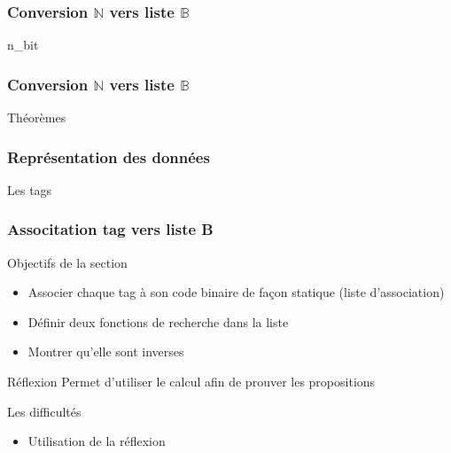 \documentclass{beamer}
\newcommand{\codefrom}[3]
           {}
\begin{document}
\begin{frame}[b,fragile]
\frametitle{Conversion $\mathbb{N}$ vers liste $\mathbb{B}$} 


\begin{block}{n\_bit}
  \fontsize{8}{10}
  \codefrom{src}{binary}{nbit}
\end{block}



\end{frame}


\begin{frame}
\frametitle{Conversion $\mathbb{N}$ vers liste $\mathbb{B}$} 

\begin{block}{Théorèmes}
    \fontsize{8}{10}
  \codefrom{src}{binary}{nbitn}
  \codefrom{src}{binary}{bitnbit}
\end{block}


\end{frame}


\begin{frame}[b,fragile]
  \frametitle{Représentation des données}
  \begin{block}{Les tags}
    
  \end{block}

  




\end{frame}
\begin{frame}[b,fragile]
  \frametitle{Associtation tag vers liste B}
  \begin{block}{Objectifs de la section}
    \begin{itemize}
    \item Associer chaque tag à son code binaire de façon statique (liste d'association)
    \item Définir deux fonctions de recherche dans la liste
    \item Montrer qu'elle sont inverses
    \end{itemize}   
  \end{block}

  \begin{block}{Réflexion}
    Permet d'utiliser le calcul afin de prouver les propositions
  \end{block}
  
 
\begin{block}{Les difficultés}
  \begin{itemize}
  \item Utilisation de la réflexion
  \end{itemize}   
\end{block}
  
\end{frame}
\end{document}
